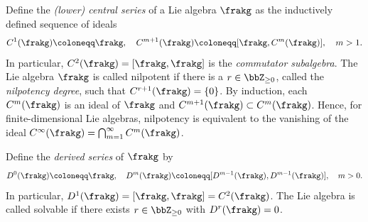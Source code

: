 \begin{defn}
    Define the \emph{(lower) central series} of a Lie algebra $\frakg$ as the inductively defined sequence of ideals 
    \[C^1(\frakg)\coloneqq\frakg,\quad C^{m+1}(\frakg)\coloneqq [\frakg,C^m(\frakg)],\quad m>1.\]
    In particular, $C^2(\frakg)=[\frakg,\frakg]$ is the \emph{commutator subalgebra}. The Lie algebra $\frakg$ is called nilpotent if there is a $r\in\bbZ_{\geq 0}$, called the \emph{nilpotency degree}, such that $C^{r+1}(\frakg)=\{0\}$. By induction, each $C^m(\frakg)$ is an ideal of $\frakg$ and $C^{m+1}(\frakg)\subset C^m(\frakg)$. Hence, for finite-dimensional Lie algebras, nilpotency is equivalent to the vanishing of the ideal $C^\infty(\frakg)=\bigcap_{m=1}^\infty C^m(\frakg)$.

    Define the \emph{derived series} of $\frakg$ by 
    \[D^0(\frakg)\coloneqq \frakg,\quad D^m(\frakg)\coloneqq [D^{m-1}(\frakg),D^{m-1}(\frakg)],\quad m>0.\]
    In particular, $D^1(\frakg)=[\frakg,\frakg]=C^2(\frakg)$. The Lie algebra is called solvable if there exists $r\in\bbZ_{\geq 0}$ with $D^r(\frakg)=0$. 
\end{defn}

